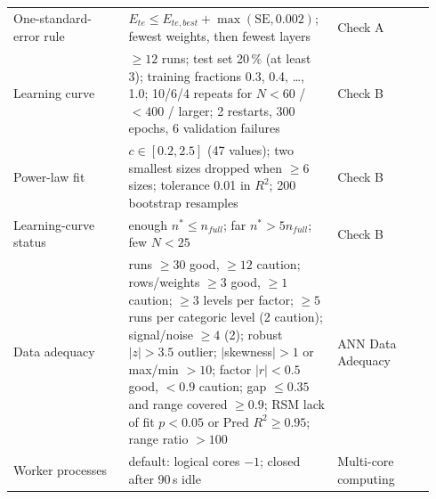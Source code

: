 {\begin{longtable}{@{}p{0.26\linewidth}p{0.46\linewidth}p{0.22\linewidth}@{}}
One-standard-error rule & $E_{te} \le E_{te,best} + \max(\mathrm{SE}, 0.002)$; fewest weights, then fewest layers &
  Check A \\
Learning curve & $\ge 12$ runs; test set 20\,\% (at least 3); training fractions 0.3, 0.4, \dots, 1.0; 10/6/4 repeats
  for $N < 60$ / $< 400$ / larger; 2 restarts, 300 epochs, 6 validation failures & Check B \\
Power-law fit & $c \in [0.2, 2.5]$ (47 values); two smallest sizes dropped when $\ge 6$ sizes; tolerance 0.01 in
  $R^2$; 200 bootstrap resamples & Check B \\
Learning-curve status & enough $n^* \le n_{full}$; far $n^* > 5n_{full}$; few $N < 25$ & Check B \\
Data adequacy & runs $\ge 30$ good, $\ge 12$ caution; rows/weights $\ge 3$ good, $\ge 1$ caution; $\ge 3$ levels per
  factor; $\ge 5$ runs per categoric level (2 caution); signal/noise $\ge 4$ (2); robust $|z| > 3.5$ outlier;
  $|$skewness$| > 1$ or max/min $> 10$; factor $|r| < 0.5$ good, $< 0.9$ caution; gap $\le 0.35$ and range covered
  $\ge 0.9$; RSM lack of fit $p < 0.05$ or Pred $R^2 \ge 0.95$; range ratio $> 100$ & ANN Data Adequacy \\
Worker processes & default: logical cores $-1$; closed after 90\,s idle & Multi-core computing \\
\end{longtable}}

